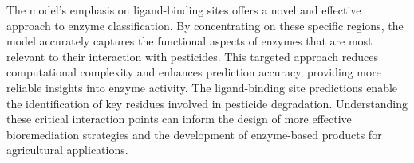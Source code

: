 The model's emphasis on ligand-binding sites offers a novel and effective approach to enzyme classification. By concentrating on these specific regions, the model accurately captures the functional aspects of enzymes that are most relevant to their interaction with pesticides. This targeted approach reduces computational complexity and enhances prediction accuracy, providing more reliable insights into enzyme activity. The ligand-binding site predictions enable the identification of key residues involved in pesticide degradation. Understanding these critical interaction points can inform the design of more effective bioremediation strategies and the development of enzyme-based products for agricultural applications. 